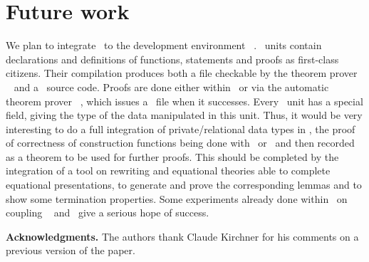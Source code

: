 
\section{Future work}
\label{sec-futur}

We plan to integrate \moca\ to the development environment \focal\
\cite{focal0.3.1}. \focal\ units contain declarations and
definitions of functions, statements and proofs as first-class
citizens. Their compilation produces both a file checkable by the
theorem prover \coq\ \cite{coq8.0} and a \ocaml\ source code. Proofs
are done either within \coq\ or via the automatic theorem prover
\zenon\ \cite{zenon0.4.1}, which issues a \coq\ file when it
successes. Every \focal\ unit has a special field, giving the type of
the data manipulated in this unit. Thus, it would be very interesting
to do a full integration of private/relational data types in \focal,
the proof of correctness of construction functions being done with
\zenon\ or \coq\ and then recorded as a theorem to be used for further
proofs. This should be completed by the integration of a tool on
rewriting and equational theories able to complete equational
presentations, to generate and prove the corresponding lemmas and to
show some termination properties. Some experiments already done within
\focal\ on coupling \cime\ \cite{cime2.02} and \zenon\ give a serious
hope of success.

{\bf Acknowledgments.} The authors thank Claude Kirchner for his
comments on a previous version of the paper.
